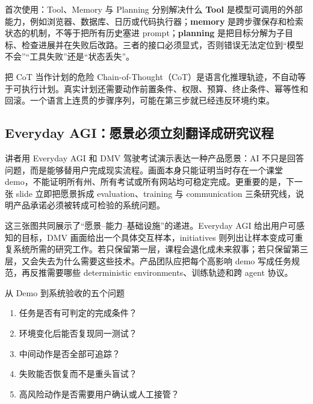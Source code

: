 \begin{knowledgebox}{首次使用：Tool、Memory 与 Planning 分别解决什么}
\textbf{Tool} 是模型可调用的外部能力，例如浏览器、数据库、日历或代码执行器；\textbf{memory} 是跨步骤保存和检索状态的机制，不等于把所有历史塞进 prompt；\textbf{planning} 是把目标分解为子目标、检查进展并在失败后改路。三者的接口必须显式，否则错误无法定位到“模型不会”“工具失败”还是“状态丢失”。
\end{knowledgebox}

\begin{warningbox}{把 CoT 当作计划的危险}
Chain-of-Thought（CoT）是语言化推理轨迹，不自动等于可执行计划。真实计划还需要动作前置条件、权限、预算、终止条件、幂等性和回滚。一个语言上连贯的步骤序列，可能在第三步就已经违反环境约束。
\end{warningbox}

\subsection{Everyday AGI：愿景必须立刻翻译成研究议程}

讲者用 Everyday AGI 和 DMV 驾驶考试演示表达一种产品愿景：AI 不只是回答问题，而是能够替用户完成现实流程。画面本身只能证明当时存在一个课堂 demo，不能证明所有州、所有考试或所有网站均可稳定完成。更重要的是，下一张 slide 立即把愿景拆成 evaluation、training 与 communication 三条研究线，说明产品承诺必须被转成可检验的系统问题。




这三张图共同展示了“愿景--能力--基础设施”的递进。Everyday AGI 给出用户可感知的目标，DMV 画面给出一个具体交互样本，initiatives 则列出让样本变成可重复系统所需的研究工作。若只保留第一层，课程会退化成未来叙事；若只保留第三层，又会失去为什么需要这些技术。产品团队应把每个高影响 demo 写成任务规范，再反推需要哪些 deterministic environments、训练轨迹和跨 agent 协议。


\begin{importantbox}{从 Demo 到系统验收的五个问题}
\begin{enumerate}
  \item 任务是否有可判定的完成条件？
  \item 环境变化后能否复现同一测试？
  \item 中间动作是否全部可追踪？
  \item 失败能否恢复而不是重头盲试？
  \item 高风险动作是否需要用户确认或人工接管？
\end{enumerate}
\end{importantbox}

